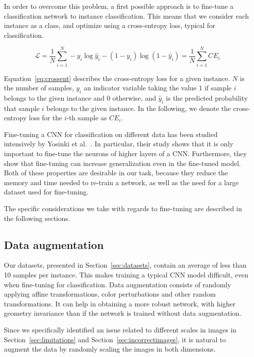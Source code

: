 In order to overcome this problem, a first possible approach is to fine-tune
a classification network to instance classification. This means that
we consider each instance as a class, and optimize using a cross-entropy
loss, typical for classification.

\begin{equation}\label{eq:crossent}
\mathcal{L} = \frac{1}{N}
\sum_{i=1}^N -y_i \log \hat{y}_i - (1-y_i) \log (1-\hat{y}_i)
= \frac{1}{N} \sum_{i=1}^N \mathit{CE}_i
\end{equation}

Equation~\ref{eq:crossent} describes the cross-entropy loss for a
given instance. $N$ is the number of samples, $y_i$ an indicator
variable taking the value $1$ if sample $i$ belongs to the given
instance and $0$ otherwise, and $\hat{y}_i$ is the predicted probability
that sample $i$ belongs to the given instance. In the following,
we denote the cross-entropy loss for the $i$-th sample as
$\mathit{CE}_i$.

Fine-tuning a CNN for classification on different data has been studied
intensively by Yosinki et al.~\cite{yosinski_how_2014}. In particular,
their study shows that it is only important to fine-tune the neurons
of higher layers of a CNN. Furthermore, they show that
fine-tuning can increase generalization even in the fine-tuned model.
Both of these properties are desirable in our task, because they reduce
the memory and time needed to re-train a network, as well as the need
for a large dataset used for fine-tuning.

The specific considerations we take with regards to fine-tuning are
described in the following sections.

\subsection{Data augmentation}
Our datasets, presented in Section~\ref{sec:datasets},
contain an average of less than 10 samples per instance.
This makes training a typical CNN model difficult,
even when fine-tuning for classification.
Data augmentation consists of randomly applying
affine transformations, color perturbations and other random transformations.
It can help in obtaining a more robust network, with higher
geometry invariance than if the network is trained without data
augmentation.

Since we specifically identified an issue related to different scales
in images in Section~\ref{sec:limitations} and Section~\ref{sec:incorrectimages},
it is natural to augment the data by randomly scaling the images in both
dimensions.

